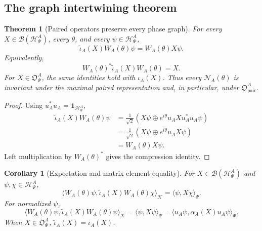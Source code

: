 \documentclass[11pt,reqno]{scrartcl}
\newcommand{\scrK}{\mathscr K}
\newcommand{\idop}{\mathbf 1}
\newcommand{\polA}{u_A}
\newcommand{\inner}[2]{\langle #1,#2\rangle}
\newcommand{\actHP}{\mathscr H_{\Psi}^{A}}
\newcommand{\NAtheta}{\mathscr N_{A}(\theta)}
\newcommand{\WAtheta}{W_{A}(\theta)}
\newcommand{\alphaA}{\alpha_{A}}
\newcommand{\iotaA}{\iota_{A}}
\newcommand{\iotaMaxA}{\widetilde{\iota}_{A}}
\newcommand{\obsP}{\mathfrak O_{\Psi}^{A}}
\newcommand{\obsPair}{\mathfrak O_{\mathrm{pair}}^{A}}
\theoremstyle{plain}
\newtheorem{theorem}{Theorem}[section]
\newtheorem{corollary}[corollary]{Corollary}
\theoremstyle{definition}
\theoremstyle{remark}
\begin{document}
\subsection{The graph intertwining theorem}

\begin{theorem}[Paired operators preserve every phase graph]
\label{thm:paired-algebra-graph-intertwining}
For every $X\in\mathcal B(\actHP)$, every $\theta$, and every
$\psi\in\actHP$,
\begin{equation}
  \boxed{
  \iotaMaxA(X)\WAtheta\psi
  =\WAtheta X\psi.}
  \label{eq:paired-graph-intertwining}
\end{equation}
Equivalently,
\begin{equation}
  \WAtheta^*\iotaMaxA(X)\WAtheta=X.
  \label{eq:paired-compression-identity}
\end{equation}
For $X\in\obsP$, the same identities hold with $\iotaA(X)$.  Thus every
$\NAtheta$ is invariant under the maximal paired representation and, in
particular, under $\obsPair$.
\end{theorem}

\begin{proof}
Using $\polA^*\polA=\idop_{\actHP}$,
\begin{align}
  \iotaMaxA(X)\WAtheta\psi
  &=\frac1{\sqrt2}
    \left(
      X\psi\oplus
      e^{i\theta}\polA X\polA^*\polA\psi
    \right)\\
  &=\frac1{\sqrt2}
    \left(
      X\psi\oplus e^{i\theta}\polA X\psi
    \right)\\
  &=\WAtheta X\psi.
\end{align}
Left multiplication by $\WAtheta^*$ gives the compression identity.
\end{proof}

\begin{corollary}[Expectation and matrix-element equality]
\label{cor:paired-expectation-equality}
For $X\in\mathcal B(\actHP)$ and $\psi,\chi\in\actHP$,
\begin{equation}
  \boxed{
  \inner{\WAtheta\psi}{\iotaMaxA(X)\WAtheta\chi}_{\scrK}
  =\inner{\psi}{X\chi}_{\Psi}.}
  \label{eq:paired-matrix-element-equality}
\end{equation}
For normalized $\psi$,
\begin{equation}
  \inner{\WAtheta\psi}{\iotaMaxA(X)\WAtheta\psi}_{\scrK}
  =\inner{\psi}{X\psi}_{\Psi}
  =\inner{\polA\psi}{\alphaA(X)\polA\psi}_{\Phi}.
  \label{eq:three-expectation-equality}
\end{equation}
When $X\in\obsP$, $\iotaMaxA(X)=\iotaA(X)$.
\end{corollary}
\end{document}
